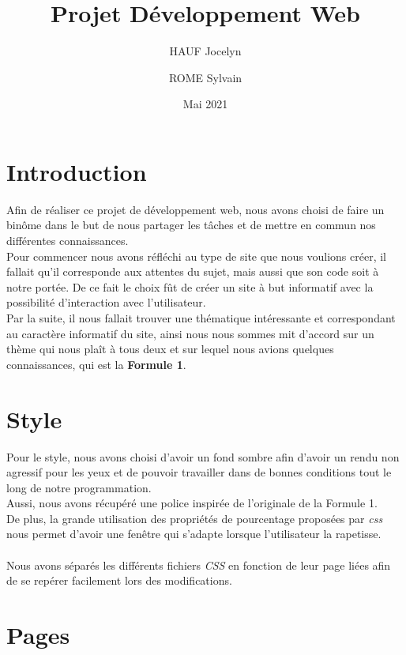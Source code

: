 \documentclass{article}
\title{Projet Développement Web}
\author{HAUF Jocelyn \and ROME Sylvain}
\date{Mai 2021}
\begin{document}
\maketitle

\newpage

\tableofcontents

\newpage

\section{Introduction}


Afin de réaliser ce projet de développement web, nous avons choisi de faire un binôme dans le but de nous partager les tâches et de mettre en commun nos différentes connaissances.\\
Pour commencer nous avons réfléchi au type de site que nous voulions créer, il fallait qu'il corresponde aux attentes du sujet, mais aussi que son code soit à notre portée. De ce fait le choix fût de créer un site à but informatif avec la possibilité d'interaction avec l'utilisateur.\\
Par la suite, il nous fallait trouver une thématique intéressante et correspondant au caractère informatif du site, ainsi nous nous sommes mit d'accord sur un thème qui nous plaît à tous deux et sur lequel nous avions quelques connaissances, qui est la \textbf{Formule 1}.\\

\section{Style}

Pour le style, nous avons choisi d'avoir un fond sombre afin d'avoir un rendu non agressif pour les yeux et de pouvoir travailler dans de bonnes conditions tout le long de notre programmation.\\
Aussi, nous avons récupéré une police inspirée de l'originale de la Formule 1.\\
De plus, la grande utilisation des propriétés de pourcentage proposées par \emph{css} nous permet d'avoir une fenêtre qui s'adapte lorsque l'utilisateur la rapetisse.\\
\\
Nous avons séparés les différents fichiers \emph{CSS} en fonction de leur page liées afin de se repérer facilement lors des modifications.\\

\section{Pages}
\end{document}
